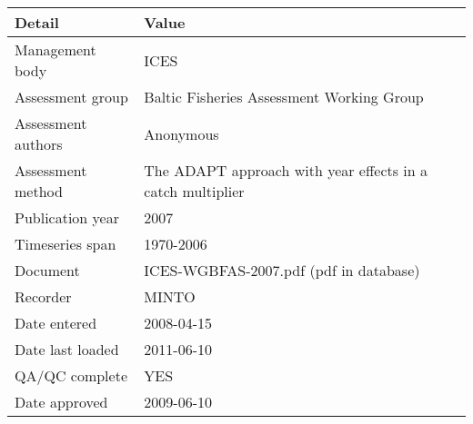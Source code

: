 \begin{table}[htb]
\centering
\begin{tabular}{lp{7cm}}
\toprule
Detail & Value \\
\midrule
Management body    & ICES                                                       \\
Assessment group   & Baltic Fisheries Assessment Working Group                  \\
Assessment authors & Anonymous                                                  \\
Assessment method  & The ADAPT approach with year effects in a catch multiplier \\
Publication year   & 2007                                                       \\
Timeseries span    & 1970-2006                                                  \\
Document           & ICES-WGBFAS-2007.pdf (pdf in database)                     \\
Recorder           & MINTO                                                      \\
Date entered       & 2008-04-15                                                 \\
Date last loaded   & 2011-06-10                                                 \\
QA/QC complete     & YES                                                        \\
Date approved      & 2009-06-10                                                 \\
\bottomrule
\end{tabular}
\label{tab:assessdet}
\end{table}
